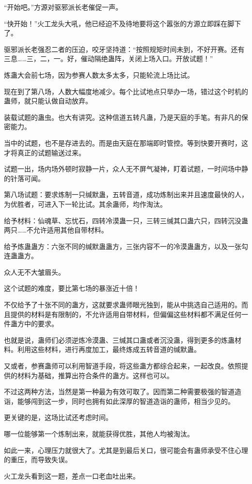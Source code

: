 \begin{this_body}
“开始吧。”方源对驱邪派长老催促一声。

“快开始！”火工龙头大吼，他已经迫不及待地要将这个嚣张的方源立即踩在脚下了。

驱邪派长老强忍二者的压迫，咬牙坚持道：“按照规矩时间未到，不好开赛。还有三息……三，二，一。好，催动隔绝蛊阵，关闭上场入口。开放试题！”

炼蛊大会前七场，因为参赛人数太多太多，只能轮流上场比试。

现在到了第八场，人数大幅度地减少。每个比试地点只举办一场，错过这个时机的蛊师，就只能认做自动放弃。

装载试题的蛊虫。也大有讲究。这种信道五转凡蛊，乃是天庭的手笔。有非凡的保密能力。

当中的试题，也不是存进去的。而是由天庭在那端即时管控。等到快要开赛时，这才将真正的试题输送过来。

试题一出，场内场外顿时寂静一片，众人无不屏气凝神，盯着试题，一时间场中静的针落可闻。

第八场试题：要求炼制一只缄默蛊，五转音道，成功炼制出来并且速度最快的人，为优胜者，可进入下一轮比试。其余蛊师，均作淘汰。

给予材料：仙魂草、忘忧石，四转冷漠蛊一只，三转三缄其口蛊六只，四转沉没蛊两只……不允许适用其他自带材料。

给予炼蛊蛊方：六张不同的缄默蛊蛊方，三张内容不一的冷漠蛊蛊方，以及一张勾连蛊蛊方。

众人无不大皱眉头。

这个试题的难度，要比第七场的暴涨近十倍！

不仅给予了十张不同的蛊方，这就要求蛊师眼光独到，能从中挑选自己适用的。而且提供的材料是有限制的，不允许适用自带材料，但偏偏这些材料都不满足任何一件蛊方中的要求。

也就是说，蛊师们必须逆炼冷漠蛊、三缄其口蛊或者沉没蛊，得到更多的炼蛊材料。利用这些材料，进行再度加工，最终炼成五转音道的缄默蛊。

又或者，参赛蛊师可以利用智道手段，将这些蛊方都综合起来，一起改良。依照提供的材料为基础，推算出符合条件的蛊方。这样也可以。

不过这两种方法，当然是第一种最为有效可取了。因而第二种需要极强的智道造诣，能够闯到这一步，同时也拥有如此深厚的智道造诣的蛊师，相当少见的。

更关键的是，这场比试还考虑时间。

哪一位能够第一个炼制出来，就能获得优胜，其他人均被淘汰。

如此一来，心理压力就很大了。尤其是到最后关口，很可能会有蛊师承受不住心理的重压，而导致失误。

火工龙头看到这一题，差点一口老血吐出来。


\end{this_body}
